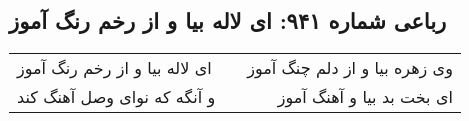 \begin{center}
\section*{رباعی شماره ۹۴۱: ای لاله بیا و از رخم رنگ آموز}
\label{sec:0941}
\begin{longtable}{l p{0.5cm} r}
ای لاله بیا و از رخم رنگ آموز
&&
وی زهره بیا و از دلم چنگ آموز
\\
و آنگه که نوای وصل آهنگ کند
&&
ای بخت بد بیا و آهنگ آموز
\\
\end{longtable}
\end{center}
